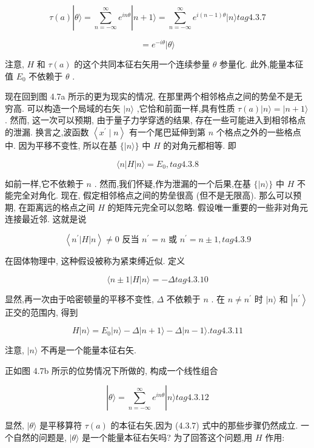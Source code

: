 $$
\tau \left( a\right) \left| {\theta \rangle = \mathop{\sum }\limits_{{n = - \infty }}^{\infty }{e}^{in\theta }}\right| n + 1\rangle = \mathop{\sum }\limits_{{n = - \infty }}^{\infty }{e}^{i\left( {n - 1}\right) \theta }|n\rangle tag{4.3.7}
$$

$$
= {e}^{-{i\theta }}|\theta \rangle
$$

注意, $H$ 和 $\tau \left( a\right)$ 的这个共同本征右矢用一个连续参量 $\theta$ 参量化. 此外,能量本征值 ${E}_{0}$ 不依赖于 $\theta$ .

现在回到图 4.7a 所示的更为现实的情况, 在那里两个相邻格点之间的势垒不是无穷高. 可以构造一个局域的右矢 $|n\rangle$ ,它恰和前面一样,具有性质 $\tau \left( a\right) \left| {n\rangle = }\right| n + 1\rangle$ . 然而, 这一次可以预期, 由于量子力学穿透的结果, 存在一些可能进入到相邻格点的泄漏. 换言之,波函数 $\left\langle {{x}^{\prime } \mid n}\right\rangle$ 有一个尾巴延伸到第 $n$ 个格点之外的一些格点中. 因为平移不变性, 所以在基 $\{ |n\rangle \}$ 中 $H$ 的对角元都相等. 即

$$
\langle n\left| H\right| n\rangle = {E}_{0}, tag{4.3.8}
$$

如前一样,它不依赖于 $n$ . 然而,我们怀疑,作为泄漏的一个后果,在基 $\{ |n\rangle \}$ 中 $H$ 不能完全对角化. 现在, 假定相邻格点之间的势垒很高 (但不是无限高). 那么可以预期, 在距离远的格点之间 $H$ 的矩阵元完全可以忽略. 假设唯一重要的一些非对角元连接最近邻. 这就是说

$$
\left\langle {{n}^{\prime }\left| H\right| n}\right\rangle \neq 0\text{ 反当 }{n}^{\prime } = n\text{ 或 }{n}^{\prime } = n \pm 1, tag{4.3.9}
$$

在固体物理中, 这种假设被称为紧束缚近似. 定义

$$
\langle n \pm 1\left| H\right| n\rangle = - \Delta tag{4.3.10}
$$

显然,再一次由于哈密顿量的平移不变性, $\Delta$ 不依赖于 $n$ . 在 $n \neq {n}^{\prime }$ 时 $|n\rangle$ 和 $\left| {n}^{\prime }\right\rangle$ 正交的范围内, 得到

$$
H\left| {n\rangle = {E}_{0}}\right| n\rangle - \Delta \left| {n + 1\rangle - \Delta }\right| n - 1\rangle . tag{4.3.11}
$$

注意, $|n\rangle$ 不再是一个能量本征右矢.

正如图 4.7b 所示的位势情况下所做的, 构成一个线性组合

$$
|\theta \rangle = \mathop{\sum }\limits_{{n = - \infty }}^{\infty }{e}^{in\theta }|n\rangle tag{4.3.12}
$$

显然, $|\theta \rangle$ 是平移算符 $\tau \left( a\right)$ 的本征右矢,因为 (4.3.7) 式中的那些步骤仍然成立. 一个自然的问题是, $|\theta \rangle$ 是一个能量本征右矢吗? 为了回答这个问题,用 $H$ 作用:

